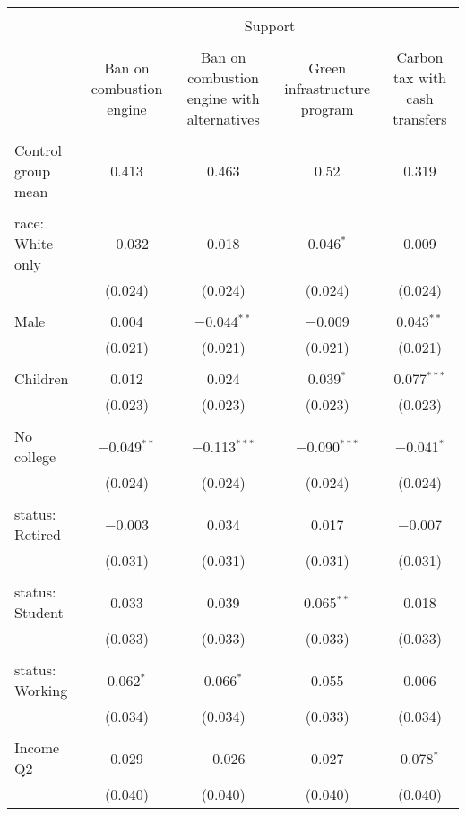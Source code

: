
\begin{tabular}{@{\extracolsep{5pt}}lcccc} 
\\[-1.8ex]\hline 
\hline \\[-1.8ex] 
 & \multicolumn{4}{c}{Support} \\ 
\cline{2-5} 
\\[-1.8ex] & Ban on combustion engine & Ban on combustion engine with alternatives & Green infrastructure program & Carbon tax with cash transfers \\ 
\hline \\[-1.8ex] 
 Control group mean & 0.413 & 0.463 & 0.52 & 0.319  \\ \hline \\[-1.8ex] race: White only & $-$0.032 & 0.018 & 0.046$^{*}$ & 0.009 \\ 
  & (0.024) & (0.024) & (0.024) & (0.024) \\ 
  & & & & \\ 
 Male & 0.004 & $-$0.044$^{**}$ & $-$0.009 & 0.043$^{**}$ \\ 
  & (0.021) & (0.021) & (0.021) & (0.021) \\ 
  & & & & \\ 
 Children & 0.012 & 0.024 & 0.039$^{*}$ & 0.077$^{***}$ \\ 
  & (0.023) & (0.023) & (0.023) & (0.023) \\ 
  & & & & \\ 
 No college & $-$0.049$^{**}$ & $-$0.113$^{***}$ & $-$0.090$^{***}$ & $-$0.041$^{*}$ \\ 
  & (0.024) & (0.024) & (0.024) & (0.024) \\ 
  & & & & \\ 
 status: Retired & $-$0.003 & 0.034 & 0.017 & $-$0.007 \\ 
  & (0.031) & (0.031) & (0.031) & (0.031) \\ 
  & & & & \\ 
 status: Student & 0.033 & 0.039 & 0.065$^{**}$ & 0.018 \\ 
  & (0.033) & (0.033) & (0.033) & (0.033) \\ 
  & & & & \\ 
 status: Working & 0.062$^{*}$ & 0.066$^{*}$ & 0.055 & 0.006 \\ 
  & (0.034) & (0.034) & (0.033) & (0.034) \\ 
  & & & & \\ 
 Income Q2 & 0.029 & $-$0.026 & 0.027 & 0.078$^{*}$ \\ 
  & (0.040) & (0.040) & (0.040) & (0.040) \\ 

\end{tabular}
